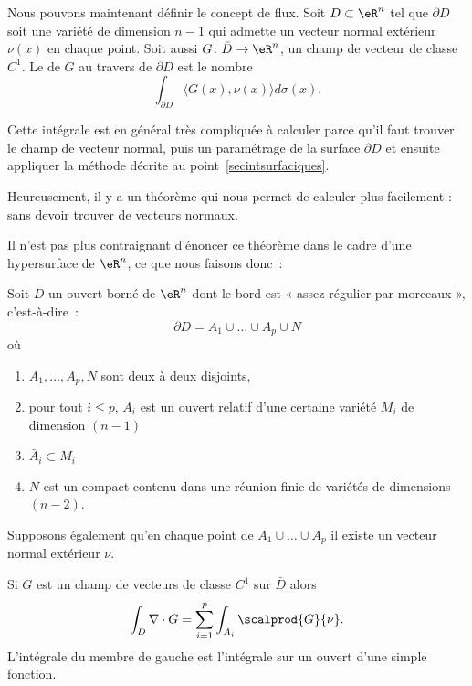 Nous pouvons maintenant définir le concept de flux. Soit \( D\subset \eR^n\) tel que \( \partial D\) soit une variété de dimension \( n-1\) qui admette un vecteur normal extérieur \( \nu(x)\) en chaque point. Soit aussi \( G\colon \bar D\to \eR^n\), un champ de vecteur de classe \( C^1\). Le  de \( G\) au travers de \( \partial D\) est le nombre
\begin{equation}
	\int_{\partial D}\langle G(x), \nu(x)\rangle d\sigma(x).
\end{equation}

Cette intégrale est en général très compliquée à calculer parce qu'il faut trouver le champ de vecteur normal, puis un paramétrage de la surface \( \partial D\) et ensuite appliquer la méthode décrite au point~\ref{secintsurfaciques}.

Heureusement, il y a un théorème qui nous permet de calculer plus facilement : sans devoir trouver de vecteurs normaux.

Il n'est pas plus contraignant d'énoncer ce théorème dans le cadre d'une hypersurface de \( \eR^n\), ce que nous faisons donc~:
\begin{theorem}
	Soit \( D\) un ouvert borné de \( \eR^n\) dont le bord est « assez régulier par morceaux », c'est-à-dire~:
	\begin{equation}
		\partial D = A_1 \cup \ldots \cup A_p \cup N
	\end{equation}
	où
	\begin{enumerate}
		\item \( A_1, \ldots, A_p, N\) sont deux à deux disjoints,
		\item pour tout \( i \leq p\), \( A_i\) est un ouvert relatif d'une certaine variété \( M_i\) de dimension \( (n-1)\)
		\item \( \bar A_i \subset M_i\)
		\item \( N\) est un compact contenu dans une réunion finie de variétés de dimensions \( (n-2)\).
	\end{enumerate}
	Supposons également qu'en chaque point de \( A_1 \cup \ldots \cup A_p\) il existe un vecteur normal extérieur \( \nu\).

	Si \( G\) est un champ de vecteurs de classe \( C^1\) sur \( \bar D\) alors
	\begin{equation}
		\int_D \nabla\cdot G = \sum_{i=1}^p \int_{A_i} \scalprod{G}{\nu}.
	\end{equation}
	L'intégrale du membre de gauche est l'intégrale sur un ouvert d'une simple fonction.
\end{theorem}

